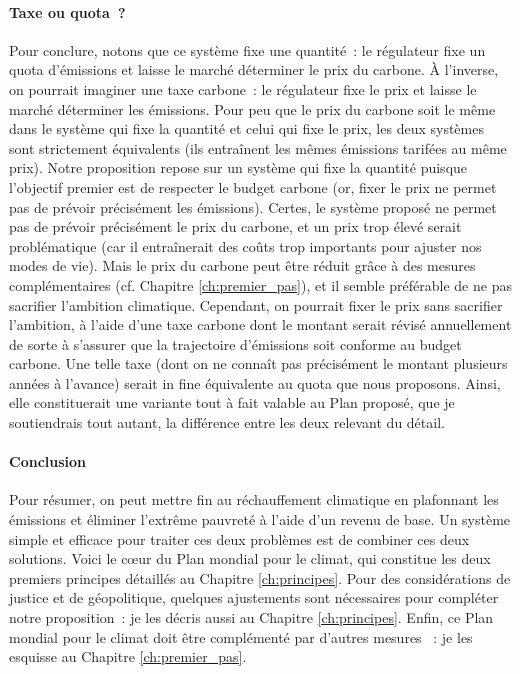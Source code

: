 \documentclass[a5paper,french,openany]{memoir}
\begin{document}
\paragraph{Taxe ou quota~?}
Pour conclure, notons que ce système fixe une quantité~: le régulateur fixe un quota d'émissions et laisse le marché déterminer le prix du carbone. À l'inverse, on pourrait imaginer une taxe carbone~: le régulateur fixe le prix et laisse le marché déterminer les émissions. Pour peu que le prix du carbone soit le même dans le système qui fixe la quantité et celui qui fixe le prix, les deux systèmes sont strictement équivalents (ils entraînent les mêmes émissions tarifées au même prix). Notre proposition repose sur un système qui fixe la quantité puisque l'objectif premier est de respecter le budget carbone (or, fixer le prix ne permet pas de prévoir précisément les émissions). Certes, le système proposé ne permet pas de prévoir précisément le prix du carbone, et un prix trop élevé serait problématique (car il entraînerait des coûts trop importants pour ajuster nos modes de vie). Mais le prix du carbone peut être réduit grâce à des mesures complémentaires (cf. Chapitre \ref{ch:premier_pas}), et il semble préférable de ne pas sacrifier l'ambition climatique. Cependant, on pourrait fixer le prix sans sacrifier l'ambition, à l'aide d'une taxe carbone dont le montant serait révisé annuellement de sorte à s'assurer que la trajectoire d'émissions soit conforme au budget carbone. Une telle taxe (dont on ne connaît pas précisément le montant plusieurs années à l'avance) serait in fine équivalente au quota que nous proposons. Ainsi, elle constituerait une variante tout à fait valable au Plan proposé, que je soutiendrais tout autant, la différence entre les deux relevant du détail. 

\paragraph{Conclusion}
Pour résumer, on peut mettre fin au réchauffement climatique en plafonnant les émissions et éliminer l'extrême pauvreté à l'aide d'un revenu de base. Un système simple et efficace pour traiter ces deux problèmes est de combiner ces deux solutions. Voici le cœur du Plan mondial pour le climat, %
qui constitue les deux premiers principes détaillés au Chapitre \ref{ch:principes}. Pour des considérations de justice et de géopolitique, quelques ajustements sont nécessaires pour compléter notre proposition~: je les décris aussi au Chapitre \ref{ch:principes}. %
Enfin, ce Plan mondial pour le climat doit être complémenté par d'autres mesures%
~: je les esquisse au Chapitre \ref{ch:premier_pas}.
\end{document}
